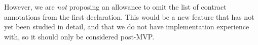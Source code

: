 However, we are \emph{not} proposing an allowance to omit the list of contract annotations from the first declaration. This would be a new feature that has not yet been studied in detail, and that we do not have implementation experience with, so it should only be considered post-MVP.




\renewcommand{\bibname}{References}




